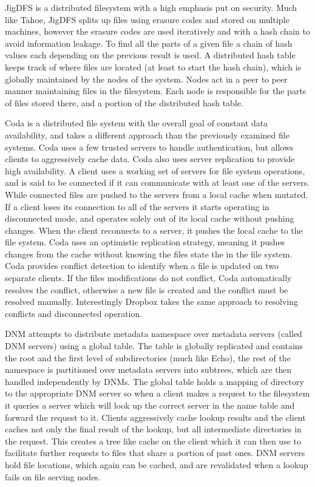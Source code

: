 JigDFS \cite{Bian2009} is a distributed filesystem with a high emphasis put on
security. Much like Tahoe, JigDFS splits up files using erasure codes and
stored on multiple machines, however the erasure codes are used iteratively
and with a hash chain to avoid information leakage. To find all the parts of a
given file a chain of hash values each depending on the previous result is
used. A distributed hash table keeps track of where files are located (at
least to start the hash chain), which is globally maintained by the nodes of
the system. Nodes act in a peer to peer manner maintaining files in the
filesystem. Each node is responsible for the parts of files stored there, and
a portion of the distributed hash table.


Coda \cite{Satyanarayanan1990} is a distributed file system with the overall
goal of constant data availability, and takes a different approach than the
previously examined file systems. Coda uses a few trusted servers to handle
authentication, but allows clients to aggressively cache data. Coda also uses
server replication to provide high availability. A client uses a working set
of servers for file system operations, and is said to be connected if it can
communicate with at least one of the servers. While connected files are pushed
to the servers from a local cache when mutated. If a client loses its
connection to all of the servers it starts operating in disconnected mode, and
operates solely out of its local cache without pushing changes. When the
client reconnects to a server, it pushes the local cache to the file system.
Coda uses an optimistic replication strategy, meaning it pushes changes from
the cache without knowing the files state the in the file system. Coda
provides conflict detection to identify when a file is updated on two separate
clients. If the files modifications do not conflict, Coda automatically
resolves the conflict, otherwise a new file is created and the conflict must
be resolved manually. Interestingly Dropbox takes the same approach to
resolving conflicts and disconnected operation.


DNM \cite{Wei2000} attempts to distribute metadata namespace over metadata
servers (called DNM servers) using a global table. The table is globally
replicated and contains the root and the first level of subdirectories (much
like Echo), the rest of the namespace is partitioned over metadata servers
into subtrees, which are then handled independently by DNMs. The global table
holds a mapping of directory to the appropriate DNM server so when a client
makes a request to the filesystem it queries a server which will look up the
correct server in the name table and forward the request to it. Clients
aggressively cache lookup results and the client caches not only the final
result of the lookup, but all intermediate directories in the request. This
creates a tree like cache on the client which it can then use to facilitate
further requests to files that share a portion of past ones. DNM servers hold
file locations, which again can be cached, and are revalidated when a lookup
fails on file serving nodes.


